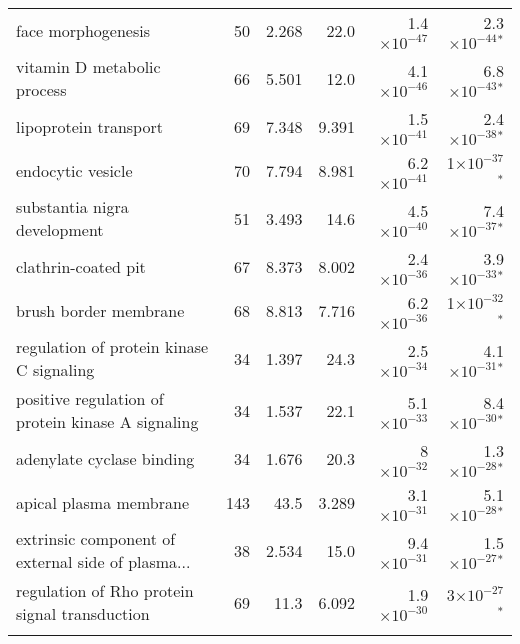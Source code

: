\begin{longtable}{|l|r|r|r|r|r|}
                                face morphogenesis &                      50 &                   2.268 &       22.0 & 1.4$\times 10^{-47}$ &  2.3$\times 10^{-44}$$\bm{^*}$ \\
                       vitamin D metabolic process &                      66 &                   5.501 &       12.0 & 4.1$\times 10^{-46}$ &  6.8$\times 10^{-43}$$\bm{^*}$ \\
                             lipoprotein transport &                      69 &                   7.348 &      9.391 & 1.5$\times 10^{-41}$ &  2.4$\times 10^{-38}$$\bm{^*}$ \\
                                 endocytic vesicle &                      70 &                   7.794 &      8.981 & 6.2$\times 10^{-41}$ &    1$\times 10^{-37}$$\bm{^*}$ \\
                      substantia nigra development &                      51 &                   3.493 &       14.6 & 4.5$\times 10^{-40}$ &  7.4$\times 10^{-37}$$\bm{^*}$ \\
                               clathrin-coated pit &                      67 &                   8.373 &      8.002 & 2.4$\times 10^{-36}$ &  3.9$\times 10^{-33}$$\bm{^*}$ \\
                             brush border membrane &                      68 &                   8.813 &      7.716 & 6.2$\times 10^{-36}$ &    1$\times 10^{-32}$$\bm{^*}$ \\
          regulation of protein kinase C signaling &                      34 &                   1.397 &       24.3 & 2.5$\times 10^{-34}$ &  4.1$\times 10^{-31}$$\bm{^*}$ \\
 positive regulation of protein kinase A signaling &                      34 &                   1.537 &       22.1 & 5.1$\times 10^{-33}$ &  8.4$\times 10^{-30}$$\bm{^*}$ \\
                         adenylate cyclase binding &                      34 &                   1.676 &       20.3 &   8$\times 10^{-32}$ &  1.3$\times 10^{-28}$$\bm{^*}$ \\
                            apical plasma membrane &                     143 &                    43.5 &      3.289 & 3.1$\times 10^{-31}$ &  5.1$\times 10^{-28}$$\bm{^*}$ \\
 extrinsic component of external side of plasma... &                      38 &                   2.534 &       15.0 & 9.4$\times 10^{-31}$ &  1.5$\times 10^{-27}$$\bm{^*}$ \\
     regulation of Rho protein signal transduction &                      69 &                    11.3 &      6.092 & 1.9$\times 10^{-30}$ &    3$\times 10^{-27}$$\bm{^*}$ \\
$$
\end{longtable}
